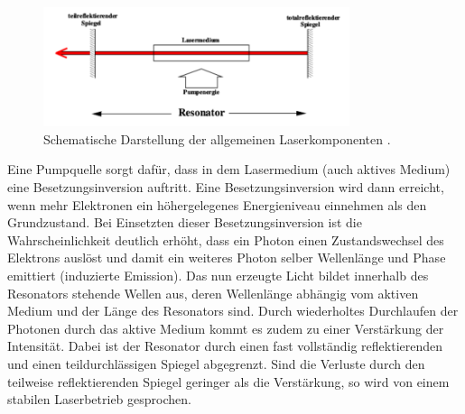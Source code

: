 \begin{figure}[htb]
  \centering
  \includegraphics[width=0.8\textwidth]{images/V61.pdf}
  \caption{Schematische Darstellung der allgemeinen Laserkomponenten \cite{anleitung2}.}
  \label{fig:laser}
\end{figure}
Eine Pumpquelle sorgt dafür, dass in dem Lasermedium (auch aktives Medium)
eine Besetzungsinversion auftritt. Eine Besetzungsinversion wird dann erreicht,
wenn mehr Elektronen ein höhergelegenes Energieniveau einnehmen als den
Grundzustand. Bei Einsetzten dieser Besetzungsinversion ist
die Wahrscheinlichkeit deutlich erhöht, dass ein Photon einen Zustandswechsel
des Elektrons auslöst und damit ein weiteres Photon selber Wellenlänge
und Phase emittiert (induzierte Emission). Das nun erzeugte Licht bildet innerhalb
des Resonators stehende Wellen aus, deren Wellenlänge abhängig vom aktiven Medium und
der Länge des Resonators sind. Durch wiederholtes Durchlaufen der Photonen durch
das aktive Medium kommt es zudem zu einer Verstärkung der Intensität. Dabei ist der
Resonator durch einen fast vollständig reflektierenden
und einen teildurchlässigen Spiegel abgegrenzt. Sind die Verluste durch den teilweise
reflektierenden Spiegel geringer als die Verstärkung, so wird von einem stabilen
Laserbetrieb gesprochen.


